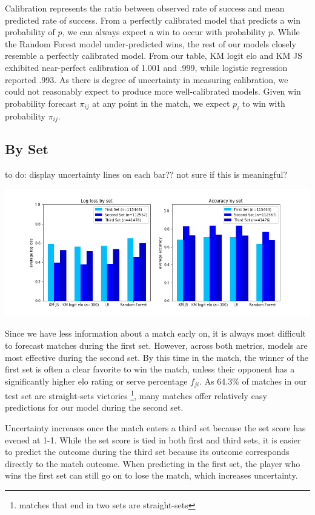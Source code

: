 \documentclass[chapterprefix=false]{report}
\begin{document}
Calibration represents the ratio between observed rate of success and mean predicted rate of success. From a perfectly calibrated model that predicts a win probability of $p$, we can always expect a win to occur with probability $p$. While the Random Forest model under-predicted wins, the rest of our models closely resemble a perfectly calibrated model. From our table, KM logit elo and KM JS exhibited near-perfect calibration of 1.001 and .999, while logistic regression reported .993. As there is degree of uncertainty in measuring calibration, we could not reasonably expect to produce more well-calibrated models. Given win probability forecast $\pi_{ij}$ at any point in the match, we expect $p_i$ to win with probability $\pi_{ij}$.

\subsection{By Set}

to do: display uncertainty lines on each bar?? not sure if this is meaningful?

\hspace*{-1.5cm}\includegraphics[scale=.6]{set_performance}

Since we have less information about a match early on, it is always most difficult to forecast matches during the first set. However, across both metrics, models are most effective during the second set. By this time in the match, the winner of the first set is often a clear favorite to win the match, unless their opponent has a significantly higher elo rating or serve percentage $f_{ji}$. As 64.3\% of matches in our test set are straight-sets victories \footnote{matches that end in two sets are straight-sets}, many matches offer relatively easy predictions for our model during the second set.

Uncertainty increases once the match enters a third set because the set score has evened at 1-1. While the set score is tied in both first and third sets, it is easier to predict the outcome during the third set because its outcome corresponds directly to the match outcome. When predicting in the first set, the player who wins the first set can still go on to lose the match, which increases uncertainty.
\end{document}

